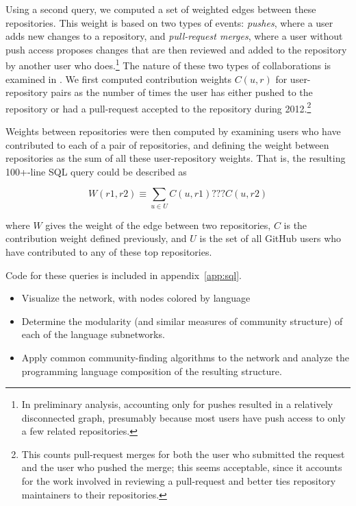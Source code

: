 \documentclass[twocolumn]{article}
\begin{document}
Using a second query, we computed a set of weighted edges between these
repositories. This weight is based on two types of events: \emph{pushes}, where
a user adds new changes to a repository, and \emph{pull-request merges}, where a
user without push access proposes changes that are then reviewed and added to
the repository by another user who does.\footnote{In preliminary analysis,
accounting only for pushes resulted in a relatively disconnected graph,
presumably because most users have push access to only a few related
repositories.} The nature of these two types of collaborations is examined in
\cite{khadke}. We first computed contribution weights $C(u, r)$ for
user-repository pairs as the number of times the user has either pushed to the
repository or had a pull-request accepted to the repository during
2012.\footnote{This counts pull-request merges for both the user who submitted
the request and the user who pushed the merge; this seems acceptable, since it
accounts for the work involved in reviewing a pull-request and better ties
repository maintainers to their repositories.}

Weights between repositories were then computed by examining users who have
contributed to each of a pair of repositories, and defining the weight between
repositories as the sum of all these user-repository weights. That is, the
resulting 100+-line SQL query could be described as

\begin{equation}
    W(r1, r2) \equiv \sum_{u \in U} C(u, r1) ??? C(u, r2)
\end{equation}

where $W$ gives the weight of the edge between two repositories, $C$ is the
contribution weight defined previously, and $U$ is the set of all GitHub users
who have contributed to any of these top repositories.

Code for these queries is included in appendix~\ref{app:sql}.

\begin{itemize}
    \item Visualize the network, with nodes colored by language
    \item Determine the modularity (and similar measures of community structure)
        of each of the language subnetworks.
    \item Apply common community-finding algorithms to the network and analyze
        the programming language composition of the resulting structure.
\end{itemize}
\end{document}
